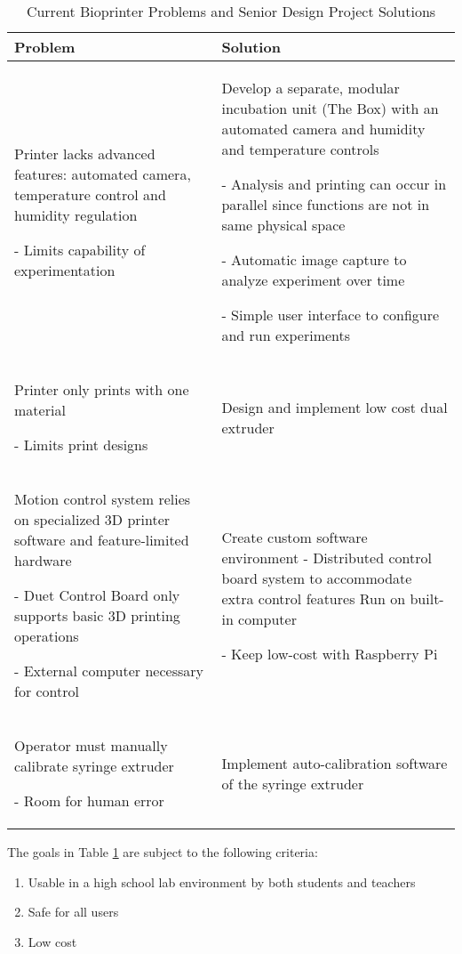 \begin{table}[H]
\caption{\label{table:problem-solution} Current Bioprinter Problems and Senior Design Project Solutions}

\begin{tabularx}{\textwidth}{ |X|X| }
  \hline
  \textbf{Problem }& \textbf{Solution }\\

  \hline 
Printer lacks advanced features: automated camera, temperature control and humidity regulation

- Limits capability of experimentation

&  

Develop a separate, modular incubation unit (The Box) with an automated camera and humidity and temperature controls

- Analysis and printing can occur in parallel since functions are not in same physical space

- Automatic image capture to analyze experiment over time

- Simple user interface to configure and run experiments
 \\


    \hline 
 Printer only prints with one material

- Limits print designs
  & 
  Design and implement low cost dual extruder
   \\
  \hline
  Motion control system relies on specialized 3D printer software and feature-limited hardware

- Duet Control Board only supports basic 3D printing operations

- External computer necessary for control
&
Create custom software environment
- Distributed control board system to accommodate extra control features
Run on built-in computer 

- Keep low-cost with Raspberry Pi 

\\
  \hline
  Operator must manually calibrate syringe extruder

- Room for human error
&
Implement auto-calibration software of the syringe extruder
\\
  \hline
\end{tabularx}

\end{table}


The goals in Table \ref{table:problem-solution} are subject to the following criteria:
\begin{enumerate}
	\item Usable in a high school lab environment by both students and teachers
	\item Safe for all users
	\item Low cost
\end{enumerate}

